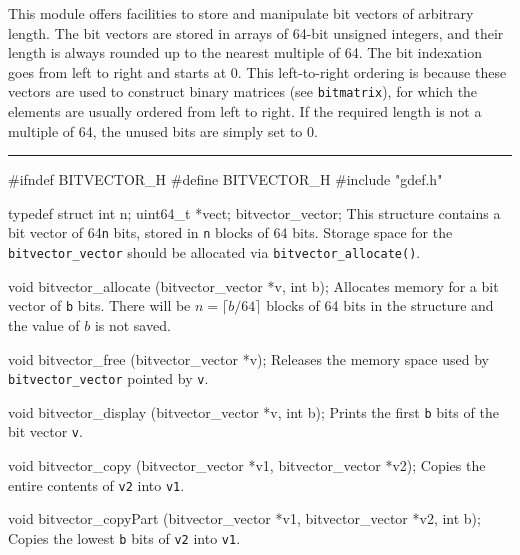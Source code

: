 
This module offers facilities to store and manipulate bit vectors of arbitrary length.
The bit vectors are stored in arrays of 64-bit unsigned integers, and their length
is always rounded up to the nearest multiple of 64.
The bit indexation goes from left to right and starts at 0.
This left-to-right ordering is because these vectors are used to construct
binary matrices (see \texttt{bitmatrix}),
for which the elements are usually ordered from left to right.
If the required length is not a multiple of 64, the unused bits are simply set to 0.


\bigskip\hrule

\code\hide
#ifndef BITVECTOR_H
#define BITVECTOR_H
\endhide
#include "gdef.h"
\endcode
\iffalse %
\code

#define bitvector_WL 64
\endcode
 \tab
Uses 64-bit words.   \pierre{Probably not needed, can be hardcoded to 64.}
 \endtab
\fi  %
\code

typedef struct{
   int n;
   uint64_t *vect;
} bitvector_vector;
\endcode
\tab
This structure contains a bit vector of 64\texttt{n} bits,
stored in {\tt n} blocks of 64 bits.
Storage space for the {\tt bitvector\_vector} should be allocated via
{\tt bitvector\_allocate()}.
\endtab
\code

void bitvector_allocate (bitvector_vector *v, int b);
\endcode
 \tab
Allocates memory for a bit vector of {\tt b} bits.
There will be $n = \lceil b/64 \rceil$ blocks of 64 bits in the structure
and the value of $b$ is not saved.
 \endtab
\code

void bitvector_free (bitvector_vector *v);
\endcode
 \tab
Releases the memory space used by {\tt bitvector\_vector} pointed by {\tt v}.
 \endtab
\code

void bitvector_display (bitvector_vector *v, int b);
\endcode
 \tab
Prints the first {\tt b} bits of the bit vector {\tt v}.
 \endtab
\code

void bitvector_copy (bitvector_vector *v1, bitvector_vector *v2);
  \endcode
 \tab
Copies the entire contents of {\tt v2} into {\tt v1}.
 \endtab
\code

void bitvector_copyPart (bitvector_vector *v1, bitvector_vector *v2, int b);
\endcode
 \tab
Copies the lowest {\tt b} bits of {\tt v2} into {\tt v1}.
 \endtab
\code

